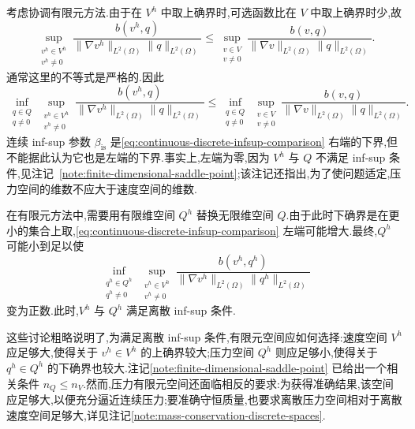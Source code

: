 \begin{note}\label{note:infsup-not-inherited}
考虑协调有限元方法.由于在 $V^h$ 中取上确界时,可选函数比在 $V$ 中取上确界时少,故
\[
  \sup_{\substack{v^h\in V^h\\v^h\ne0}}
    \frac{b(v^h,q)}{\|\nabla v^h\|_{L^2(\Omega)}\|q\|_{L^2(\Omega)}}
  \le
  \sup_{\substack{v\in V\\v\ne0}}
    \frac{b(v,q)}{\|\nabla v\|_{L^2(\Omega)}\|q\|_{L^2(\Omega)}}.
\]
通常这里的不等式是严格的.因此
\begin{equation}\label{eq:continuous-discrete-infsup-comparison}
  \inf_{\substack{q\in Q\\q\ne0}}
  \sup_{\substack{v^h\in V^h\\v^h\ne0}}
    \frac{b(v^h,q)}{\|\nabla v^h\|_{L^2(\Omega)}\|q\|_{L^2(\Omega)}}
  \le
  \inf_{\substack{q\in Q\\q\ne0}}
  \sup_{\substack{v\in V\\v\ne0}}
    \frac{b(v,q)}{\|\nabla v\|_{L^2(\Omega)}\|q\|_{L^2(\Omega)}}.
\end{equation}
连续 inf-sup 参数 $\beta_{\mathrm{is}}$ 是\cref{eq:continuous-discrete-infsup-comparison} 右端的下界,但不能据此认为它也是左端的下界.事实上,左端为零,因为 $V^h$ 与 $Q$ 不满足 inf-sup 条件,见注记~\ref{note:finite-dimensional-saddle-point};该注记还指出,为了使问题适定,压力空间的维数不应大于速度空间的维数.

在有限元方法中,需要用有限维空间 $Q^h$ 替换无限维空间 $Q$.由于此时下确界是在更小的集合上取,\cref{eq:continuous-discrete-infsup-comparison} 左端可能增大.最终,$Q^h$ 可能小到足以使
\[
  \inf_{\substack{q^h\in Q^h\\q^h\ne0}}
  \sup_{\substack{v^h\in V^h\\v^h\ne0}}
    \frac{b(v^h,q^h)}
         {\|\nabla v^h\|_{L^2(\Omega)}\|q^h\|_{L^2(\Omega)}}
\]
变为正数.此时,$V^h$ 与 $Q^h$ 满足离散 inf-sup 条件.

这些讨论粗略说明了,为满足离散 inf-sup 条件,有限元空间应如何选择:速度空间 $V^h$ 应足够大,使得关于 $v^h\in V^h$ 的上确界较大;压力空间 $Q^h$ 则应足够小,使得关于 $q^h\in Q^h$ 的下确界也较大.注记\ref{note:finite-dimensional-saddle-point} 已给出一个相关条件 $n_Q\le n_V$.然而,压力有限元空间还面临相反的要求:为获得准确结果,该空间应足够大,以便充分逼近连续压力;要准确守恒质量,也要求离散压力空间相对于离散速度空间足够大,详见注记\ref{note:mass-conservation-discrete-spaces}.
\end{note}

